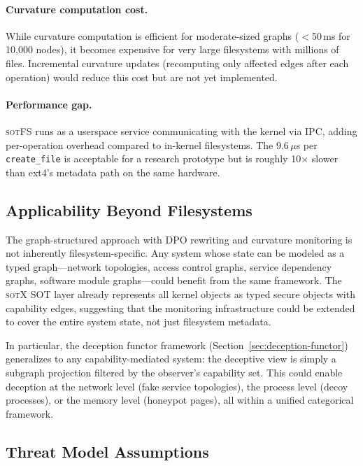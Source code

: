 \documentclass[11pt,a4paper]{article}
\theoremstyle{definition}
\theoremstyle{remark}
\newcommand{\sotfs}{\textsc{sotFS}}
\newcommand{\sotx}{\textsc{sotX}}
\begin{document}
\paragraph{Curvature computation cost.}
While curvature computation is efficient for moderate-sized graphs
($<$50\,ms for 10{,}000 nodes), it becomes expensive for very large
filesystems with millions of files. Incremental curvature updates
(recomputing only affected edges after each operation) would reduce
this cost but are not yet implemented.

\paragraph{Performance gap.}
\sotfs{} runs as a userspace service communicating with the kernel
via IPC, adding per-operation overhead compared to in-kernel
filesystems. The 9.6\,$\mu$s per \texttt{create\_file} is acceptable
for a research prototype but is roughly 10$\times$ slower than ext4's
metadata path on the same hardware.

\subsection{Applicability Beyond Filesystems}
\label{sec:discussion-applicability}

The graph-structured approach with DPO rewriting and curvature
monitoring is not inherently filesystem-specific. Any system whose
state can be modeled as a typed graph---network topologies, access
control graphs, service dependency graphs, software module
graphs---could benefit from the same framework. The \sotx{} SOT
layer already represents all kernel objects as typed secure objects
with capability edges, suggesting that the monitoring infrastructure
could be extended to cover the entire system state, not just
filesystem metadata.

In particular, the deception functor framework
(Section~\ref{sec:deception-functor}) generalizes to any
capability-mediated system: the deceptive view is simply a subgraph
projection filtered by the observer's capability set. This could
enable deception at the network level (fake service topologies),
the process level (decoy processes), or the memory level (honeypot
pages), all within a unified categorical framework.

\subsection{Threat Model Assumptions}
\label{sec:discussion-threats}
\end{document}
